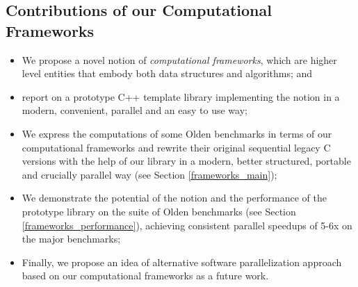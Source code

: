 \subsection{Contributions of our Computational Frameworks}
\begin{itemize}[style=unboxed,leftmargin=0cm]
\itemsep0em
\renewcommand\labelitemi{$\vartriangleright$}
\renewcommand\labelitemii{$\bullet$}
\item We propose a novel notion of \textit{computational frameworks}, which are higher level entities that embody both data structures and algorithms; and
\item report on a prototype C++ template library \cite{frameworks-repo} implementing the notion in a modern, convenient, parallel and an easy to use way;
\item We express the computations of some Olden benchmarks in terms of our computational frameworks and rewrite their original sequential legacy C versions with the help of our library in a modern, better structured, portable and crucially parallel way (see Section \ref{frameworks_main});
\item We demonstrate the potential of the notion and the performance of the prototype library on the suite of Olden benchmarks (see Section \ref{frameworks_performance}), achieving consistent parallel speedups of 5-6x on the major benchmarks;
\item Finally, we propose an idea of alternative software parallelization approach based on our computational frameworks as a future work.
\end{itemize}
